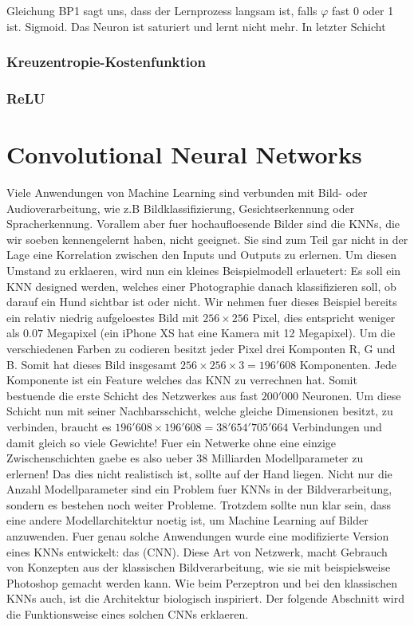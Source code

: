 Gleichung BP1 sagt uns, dass der Lernprozess langsam ist, falls $\varphi$ fast 0
oder 1 ist. Sigmoid. Das Neuron ist saturiert und lernt nicht mehr. In letzter Schicht

\subsubsection{Kreuzentropie-Kostenfunktion}

\subsubsection{ReLU}

\pagebreak
\section{Convolutional Neural Networks}
Viele Anwendungen von Machine Learning sind verbunden mit Bild- oder
Audioverarbeitung, wie z.B Bildklassifizierung, Gesichtserkennung oder
Spracherkennung.
Vorallem aber fuer hochaufloesende Bilder sind die KNNs, die wir soeben
kennengelernt haben, nicht geeignet. Sie sind zum Teil gar nicht in der
Lage eine Korrelation zwischen den Inputs und Outputs zu erlernen.
Um diesen Umstand zu erklaeren, wird nun ein kleines Beispielmodell erlauetert:
\para{}
Es soll ein KNN designed werden, welches einer Photographie danach klassifizieren
soll, ob darauf ein Hund sichtbar ist oder nicht. Wir nehmen fuer dieses
Beispiel bereits ein relativ niedrig aufgeloestes Bild mit $256 \times 256$
Pixel, dies entspricht weniger als $0.07$ Megapixel (ein iPhone XS hat eine Kamera mit
12 Megapixel). Um die verschiedenen Farben zu codieren besitzt jeder Pixel drei Komponten R, G
und B. Somit hat dieses Bild insgesamt $256 \times 256 \times 3 = 196'608$
Komponenten. Jede Komponente ist ein Feature welches das KNN zu verrechnen hat. Somit bestuende
die erste Schicht des Netzwerkes aus fast $200'000$ Neuronen. Um diese Schicht
nun mit seiner Nachbarsschicht, welche gleiche Dimensionen besitzt, zu verbinden, braucht
es $196'608 \times 196'608 = 38'654'705'664$ Verbindungen und damit gleich so
viele Gewichte! Fuer ein Netwerke ohne eine einzige Zwischenschichten gaebe es
also ueber 38 Milliarden Modellparameter zu erlernen! Das dies nicht realistisch ist,
sollte auf der Hand liegen.
\para{}
Nicht nur die Anzahl Modellparameter sind ein Problem fuer KNNs in der
Bildverarbeitung, sondern es bestehen noch weiter Probleme.
Trotzdem sollte nun klar sein, dass eine andere Modellarchitektur noetig ist, um Machine
Learning auf Bilder anzuwenden. Fuer genau solche Anwendungen wurde eine modifizierte
Version eines KNNs entwickelt: das  (CNN).
Diese Art von Netzwerk, macht Gebrauch von Konzepten aus der klassischen
Bildverarbeitung, wie sie mit beispielsweise Photoshop gemacht werden kann.
Wie beim Perzeptron und bei den klassischen KNNs auch, ist die Architektur
biologisch inspiriert.
Der folgende Abschnitt wird die Funktionsweise eines solchen CNNs erklaeren.
\para{}
\cite{deeplearning.ai:cnn}
\cite{wiki:cnn}

